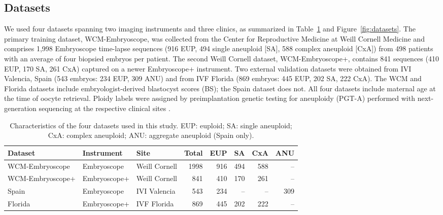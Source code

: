 \documentclass[10pt]{article}
\begin{document}
\subsection{Datasets}
We used four datasets spanning two imaging instruments and three clinics, as
summarized in Table~\ref{tab:datasets} and Figure~\ref{fig:datasets}. The
primary training dataset, WCM-Embryoscope, was collected from the Center for
Reproductive Medicine at Weill Cornell Medicine and comprises 1{,}998
Embryoscope\textregistered{} time-lapse sequences (916 EUP, 494 single
aneuploid [SA], 588 complex aneuploid [CxA]) from 498 patients with an average
of four biopsied embryos per patient. The second Weill Cornell dataset,
WCM-Embryoscope+, contains 841 sequences (410 EUP, 170 SA, 261 CxA) captured
on a newer Embryoscope+\textregistered{} instrument. Two external validation
datasets were obtained from IVI Valencia, Spain (543 embryos: 234 EUP, 309 ANU)
and from IVF Florida (869 embryos: 445 EUP, 202 SA, 222 CxA). The WCM and
Florida datasets include embryologist-derived blastocyst scores (BS); the
Spain dataset does not. All four datasets include maternal age at the time of
oocyte retrieval. Ploidy labels were assigned by preimplantation genetic
testing for aneuploidy (PGT-A) performed with next-generation sequencing at
the respective clinical sites \citep{garciapascual2020ngs}.

\begin{table}[htbp]
\centering
\caption{Characteristics of the four datasets used in this study. EUP:
euploid; SA: single aneuploid; CxA: complex aneuploid; ANU: aggregate
aneuploid (Spain only).}
\label{tab:datasets}
\begin{tabular}{lllrrrrr}
\toprule
Dataset & Instrument & Site & Total & EUP & SA & CxA & ANU \\
\midrule
WCM-Embryoscope  & Embryoscope  & Weill Cornell & 1998 & 916 & 494 & 588 & -- \\
WCM-Embryoscope+ & Embryoscope+ & Weill Cornell &  841 & 410 & 170 & 261 & -- \\
Spain            & Embryoscope  & IVI Valencia  &  543 & 234 & --  & --  & 309 \\
Florida          & Embryoscope+ & IVF Florida   &  869 & 445 & 202 & 222 & -- \\
\bottomrule
\end{tabular}
\end{table}
\end{document}
